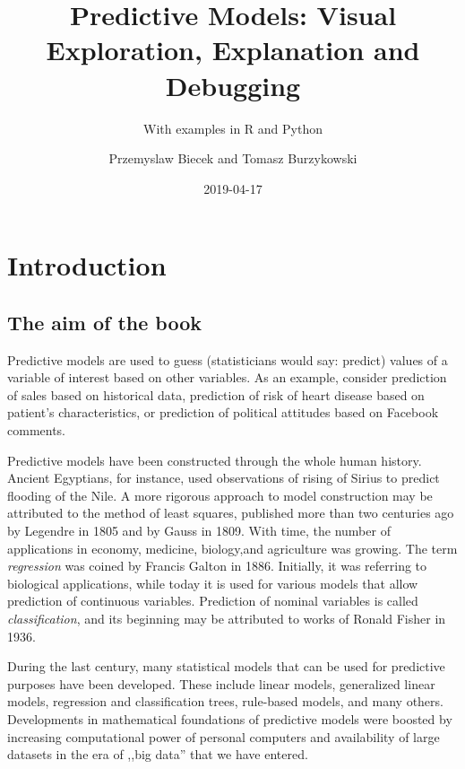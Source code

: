 \documentclass[12pt,]{krantz}
\title{Predictive Models: Visual Exploration, Explanation and Debugging}
\subtitle{With examples in R and Python}
\author{Przemyslaw Biecek and Tomasz Burzykowski}
\date{2019-04-17}
\theoremstyle{definition}
\theoremstyle{definition}
\theoremstyle{definition}
\theoremstyle{remark}
\begin{document}
\maketitle

{
\hypersetup{linkcolor=black}
\setcounter{tocdepth}{2}
\tableofcontents
}
\listoftables
\listoffigures
\hypertarget{introduction}{%
\section{Introduction}\label{introduction}}

\hypertarget{the-aim-of-the-book}{%
\subsection{The aim of the book}\label{the-aim-of-the-book}}

Predictive models are used to guess (statisticians would say: predict)
values of a variable of interest based on other variables. As an
example, consider prediction of sales based on historical data,
prediction of risk of heart disease based on patient's characteristics,
or prediction of political attitudes based on Facebook comments.

Predictive models have been constructed through the whole human history.
Ancient Egyptians, for instance, used observations of rising of Sirius
to predict flooding of the Nile. A more rigorous approach to model
construction may be attributed to the method of least squares, published
more than two centuries ago by Legendre in 1805 and by Gauss in 1809.
With time, the number of applications in economy, medicine, biology,and
agriculture was growing. The term \emph{regression} was coined by
Francis Galton in 1886. Initially, it was referring to biological
applications, while today it is used for various models that allow
prediction of continuous variables. Prediction of nominal variables is
called \emph{classification}, and its beginning may be attributed to
works of Ronald Fisher in 1936.

During the last century, many statistical models that can be used for
predictive purposes have been developed. These include linear models,
generalized linear models, regression and classification trees,
rule-based models, and many others. Developments in mathematical
foundations of predictive models were boosted by increasing
computational power of personal computers and availability of large
datasets in the era of ,,big data'' that we have entered.
\end{document}
